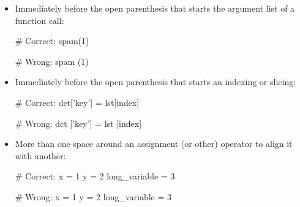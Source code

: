 \documentclass[a4paper,11pt]{article}
\begin{document}
\begin{itemize}
\item Immediately before the open parenthesis that starts the argument list of
a function call:
\begin{python}
# Correct:
spam(1)
\end{python}
\begin{python}
# Wrong:
spam (1)
\end{python}
\item Immediately before the open parenthesis that starts an indexing or
slicing:
\begin{python}
# Correct:
dct['key'] = lst[index]
\end{python}
\begin{python}
# Wrong:
dct ['key'] = lst [index]
\end{python}
\item More than one space around an assignment (or other) operator to align it
with another:
\begin{python}
# Correct:
x = 1
y = 2
long_variable = 3
\end{python}
\begin{python}
# Wrong:
x             = 1
y             = 2
long_variable = 3
\end{python}
\end{itemize}
\end{document}
